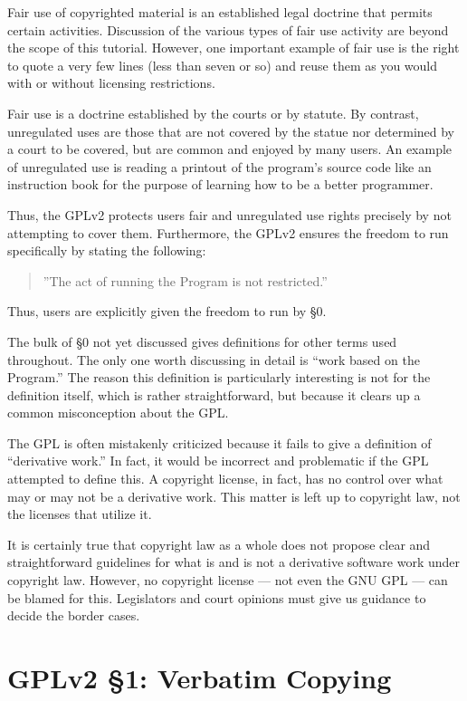 Fair use of copyrighted material is an established legal doctrine that
permits certain activities. Discussion of the various types of fair
use activity are beyond the scope of this tutorial. However, one
important example of fair use is the right to quote a very few lines
(less than seven or so) and reuse them as you would with or without
licensing restrictions.

Fair use is a doctrine established by the courts or by statute. By
contrast, unregulated uses are those that are not covered by the statue
nor determined by a court to be covered, but are common and enjoyed by
many users. An example of unregulated use is reading a printout of the
program's source code like an instruction book for the purpose of learning
how to be a better programmer.

\medskip

Thus, the GPLv2 protects users fair and unregulated use rights precisely by
not attempting to cover them. Furthermore, the GPLv2 ensures the freedom
to run specifically by stating the following:
\begin{quote}
''The act of running the Program is not restricted.''
\end{quote}
Thus, users are explicitly given the freedom to run by \S 0.

\medskip

The bulk of \S 0 not yet discussed gives definitions for other terms used
throughout. The only one worth discussing in detail is ``work based on
the Program.''  The reason this definition is particularly interesting is
not for the definition itself, which is rather straightforward, but
because it clears up a common misconception about the GPL\@.

The GPL is often mistakenly criticized because it fails to give a
definition of ``derivative work.''  In fact, it would be incorrect and
problematic if the GPL attempted to define this. A copyright license, in
fact, has no control over what may or may not be a derivative work. This
matter is left up to copyright law, not the licenses that utilize it.

It is certainly true that copyright law as a whole does not propose clear
and straightforward guidelines for what is and is not a derivative
software work under copyright law. However, no copyright license --- not
even the GNU GPL --- can be blamed for this. Legislators and court
opinions must give us guidance to decide the border cases.

\section{GPLv2 \S 1: Verbatim Copying}
\label{GPLs1}

